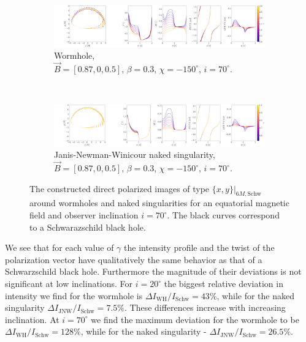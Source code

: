 \documentclass[12pt]{article}
\numberwithin{equation}{section}
\numberwithin{figure}{section}
\begin{document}
	
	\begin{figure}[!htb]
		\begin{subfigure}{16cm}
			\hspace{-1.0em}
			\includegraphics[scale = 0.15]{Section_7_Polarized_Emission/WH_delta_fig_B_0.87_0.5_0_70_deg_r6.png}
			\caption{Wormhole,\\ $\vec{B} = [0.87, 0, 0.5]$, $\beta = 0.3$, $\chi = -150^\circ$, $i = 70^\circ$.} 
		\end{subfigure}\\
		\begin{subfigure}{17cm}
			\hspace{-1em}
			\includegraphics[scale = 0.15]{Section_7_Polarized_Emission/JNW_delta_figs_B_0.87_0.0_0.5_70_deg_direct.png}
			\caption{Janis-Newman-Winicour naked singularity,\\  $\vec{B} = [0.87, 0, 0.5]$, $\beta = 0.3$, $\chi = -150^\circ$, $i = 70^\circ$.}
		\end{subfigure}
		\caption[The polarized direct images around wormholes and naked singularities for an equatorial magnetic field at $i = 70^\circ$.]{\small The constructed direct polarized images of type $\{x,y\}\vert_{6M, \text{Schw}}$ around wormholes and naked singularities for an equatorial magnetic field and observer inclination $i = 70^\circ$. The black curves correspond to a Schwarazschild black hole.} 
		\label{Direct_image_deltas_70}
	\end{figure}
	\newpage
	
	We see that for each value of $\gamma$ the intensity profile and the twist of the polarization vector have qualitatively the same behavior as that of a Schwarzschild black hole. Furthermore the magnitude of their deviations is not significant at low inclinations. For $i = 20^\circ$ the biggest relative deviation in intensity we find for the wormhole is $\Delta I_\text{WH} / I_{\text{Schw}} = 43\%$, while for the naked singularity $\Delta I_\text{JNW} / I_{\text{Schw}} = 7.5\%$. These differences increase with increasing inclination. At $i = 70^\circ$ we find the maximum deviation for the wormhole to be $\Delta I_{\text{WH}} / I_{\text{Schw}} = 128\%$, while for the naked singularity - $\Delta I_{\text{JNW}} / I_{\text{Schw}} = 26.5\%$.
	
\end{document}
